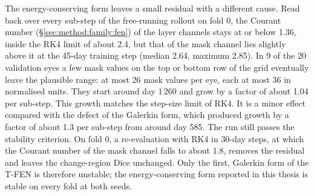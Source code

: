 The energy-conserving form leaves a small residual with a different cause.
Read back over every sub-step of the free-running rollout on fold 0, the
Courant number (\S\ref{sec:method:family:fen}) of the layer channels stays
at or below 1.36, inside the RK4 limit of about 2.4, but that of the mask
channel lies slightly above it at the 45-day training step (median 2.64,
maximum 2.85). In 9 of the 20 validation eyes a few mask values on the top
or bottom row of the grid eventually leave the plausible range: at most 26
mask values per eye, each at most 36 in normalised units. They start
around day 1\,260 and grow by a factor of about 1.04 per sub-step. This
growth matches the step-size limit of RK4. It is a minor effect compared
with the defect of the Galerkin form, which produced growth by a factor of
about 1.3 per sub-step from around day 585. The run still passes the
stability criterion. On fold 0, a re-evaluation with RK4 in 30-day steps,
at which the Courant number of the mask channel falls to about 1.8,
removes the residual and leaves the change-region Dice unchanged. Only the
first, Galerkin form of the T-FEN is therefore unstable; the
energy-conserving form reported in this thesis is stable on every fold at
both seeds.

